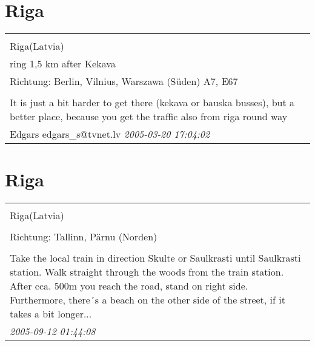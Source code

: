 \documentclass[a4paper,12pt]{article}
\begin{document}
\section{Riga}
\begin{tabular}{|p{13cm}|}
\hline\\
Riga(Latvia)\\
ring 1,5 km after Kekava\\
Richtung: Berlin, Vilnius, Warszawa (Süden) A7, E67 \\
\hline\\
It is just a bit harder to get there (kekava or bauska busses), but a better place, because you get the traffic also from riga round way \\
Edgars edgars\_s@tvnet.lv \textit{ 2005-03-20 17:04:02 }\\\hline
\end{tabular}


\section{Riga}
\begin{tabular}{|p{13cm}|}
\hline\\
Riga(Latvia)\\
\\
Richtung: Tallinn, Pärnu (Norden) \\
\hline\\
Take the local train in direction Skulte or Saulkrasti until Saulkrasti station. Walk straight through the woods from the train station. After cca. 500m you reach the road, stand on right side.
Furthermore, there´s a beach on the other side of the street, if it takes a bit longer... \\
\textit{ 2005-09-12 01:44:08 }\\\hline
\end{tabular}
\end{document}
